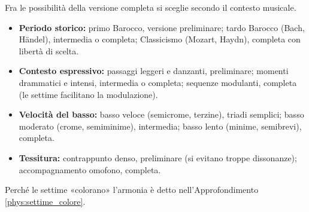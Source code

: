 Fra le possibilità della versione completa si sceglie secondo il contesto musicale.

\begin{regola}
	\label{reg:criteri_scelta_versioni}
	\begin{itemize}
		\item \textbf{Periodo storico:} primo Barocco, versione preliminare; tardo Barocco (Bach, Händel), intermedia o completa; Classicismo (Mozart, Haydn), completa con libertà di scelta.
		\item \textbf{Contesto espressivo:} passaggi leggeri e danzanti, preliminare; momenti drammatici e intensi, intermedia o completa; sequenze modulanti, completa (le settime facilitano la modulazione).
		\item \textbf{Velocità del basso:} basso veloce (semicrome, terzine), triadi semplici; basso moderato (crome, semiminime), intermedia; basso lento (minime, semibrevi), completa.
		\item \textbf{Tessitura:} contrappunto denso, preliminare (si evitano troppe dissonanze); accompagnamento omofono, completa.
	\end{itemize}
\end{regola}

Perché le settime «colorano» l'armonia è detto nell'Approfondimento \ref{phys:settime_colore}.

